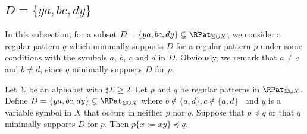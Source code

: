 
\subsection{$D = \{ ya, bc, dy \}$}\label{subsec:d3a}

\newcommand{\TheConditionA}{$b \not\in \{a,d\} \mbox{~and~} c \not\in \{a,d\}$}
\newcommand{\TheConditionAComma}{$b \not\in \{a,d\}, c \not\in \{a,d\}$}
\newcommand{\TheConditionAprime}{{\color{black}$b \neq a \mbox{~and~} c \neq d$}}
\newcommand{\TheConditionB}{$b = a,~b \not= d, \mbox{~and~} c \not\in \{a,d\}$}
\newcommand{\TheConditionBComma}{$b = a,~b \not= d, c \not\in \{a,d\}$}
\newcommand{\TheConditionBsub}{$c \not\in \{a,d\}$}
\newcommand{\TheConditionC}{$b \not\in \{a, d\},~c \not= a, \mbox{~and~} c = d$}
\newcommand{\TheConditionCComma}{$b \not\in \{a, d\},~c \not= a, c = d$}

{\color{black} In this subsection, 
for a subset $D=\{ya,bc,dy\} \subsetneq \RPat_{\Sigma\cup X}$,
we consider a regular pattern $q$ which minimally supports $D$ for a regular pattern $p$ under some conditions with the symbols $a,~b,~c$ and $d$ in $D$.
Obviously, we remark that $a\neq c$ and $b\neq d$,
since $q$ minimally supports $D$ for $p$.
}


\begin{lem}\label{lem:addpart}
  {\color{red} Let $\Sigma$ be an alphabet with $\sharp\Sigma \ge 2$.}
  {\color{black} Let {\color{black}$p$ and $q$} be regular patterns in {\color{black} $\RPat_{\Sigma\cup X}$}}.
  {\color{black} Define $D = \{ ya, bc, dy \} \subsetneq \RPat_{\Sigma\cup X}$ 
  where \TheConditionAComma~  and 
  $y$ is a variable symbol in $X$ that {\color{black}occurs in neither $p$ nor $q$}.}
  {\color{black} Suppose that $p\preceq q$ or that $q$ minimally supports $D$ for $p$. Then $p \{ x := xy \} \preceq q$}.
\end{lem}

